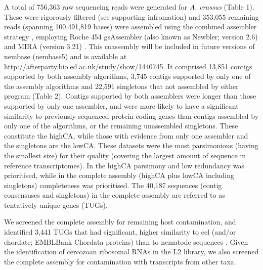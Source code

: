 \documentclass[10pt]{bmc_article}
\newenvironment{bmcformat}{\begin{raggedright}\baselineskip20pt\sloppy\setboolean{publ}{false}}{\end{raggedright}\baselineskip20pt\sloppy}
\begin{document}
\begin{bmcformat}
A total of 756,363 raw sequencing reads were generated for
\textit{A. crassus} (Table 1). These were rigorously filtered (see
supporting infromation) and 353,055 remaining reads (spanning
100,491,819 bases) were assembled using the combined assembler
strategy \cite{pmid20950480}, employing Roche 454 gsAssembler (also
known as Newbler; version 2.6) and MIRA (version 3.21)
\cite{miraEST}. This coassembly will be included in future versions of
nembase (nembase5) and is available at
http://afterparty.bio.ed.ac.uk/study/show/1440745. It comprised
13,851 contigs supported by both assembly algorithms,
3,745 contigs supported by only one of the assembly
algorithms and 22,591 singletons that not assembled by
either program (Table 2). Contigs supported by both assemblers were
longer than those supported by only one assembler, and were more
likely to have a significant similarity to previously sequenced
protein coding genes than contigs assembled by only one of the
algorithms, or the remaining unassembled singletons. These constitute
the highCA, while those with evidence from only one assembler and the
singletons are the lowCA. These datasets were the most parsimonious
(having the smallest size) for their quality (covering the largest
amount of sequence in reference transcriptomes). In the highCA
parsimony and low redundancy was prioritised, while in the complete
assembly (highCA plus lowCA including singletons) completeness was
prioritised. The 40,187 sequences (contig consensuses and singletons)
in the complete assembly are referred to as tentatively unique genes
(TUGs).




We screened the complete assembly for remaining host contamination,
and identified 3,441 TUGs that had significant, higher
similarity to eel (and/or chordate; EMBLBank Chordata proteins) than
to nematode sequences \cite{pmid21550347}. Given the identification of
cercozoan ribosomal RNAs in the L2 library, we also screened the
complete assembly for contamination with transcripts from other taxa.


\end{bmcformat}
\end{document}
